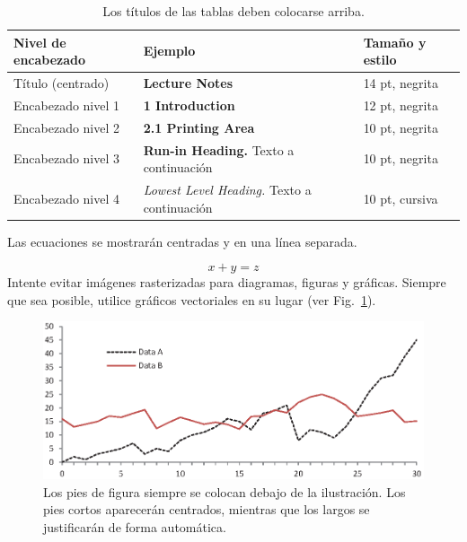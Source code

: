 \documentclass{sistedes}
\begin{document}
\begin{table}
\centering
\caption{Los títulos de las tablas deben colocarse arriba.}\label{tab1}
\begin{tabular}{|l|l|l|}
\hline
Nivel de encabezado & Ejemplo & Tamaño y estilo\\
\hline
Título (centrado) &  {\Large\bfseries Lecture Notes} & 14 pt, negrita\\
Encabezado nivel 1 &  {\large\bfseries 1 Introduction} & 12 pt, negrita\\
Encabezado nivel 2 & {\bfseries 2.1 Printing Area} & 10 pt, negrita\\
Encabezado nivel 3 & {\bfseries Run-in Heading.} Texto a continuación & 10 pt, negrita\\
Encabezado nivel 4 & {\itshape Lowest Level Heading.} Texto a continuación & 10 pt, cursiva\\
\hline
\end{tabular}
\end{table}


Las ecuaciones se mostrarán centradas y en una línea separada.

\begin{equation}
x + y = z
\end{equation}
Intente evitar imágenes rasterizadas para diagramas, figuras y gráficas. 
Siempre que sea posible, utilice gráficos vectoriales en su lugar
(ver Fig.~\ref{fig1}).

\begin{figure}
\includegraphics[width=\textwidth]{fig1.eps}
\caption{Los pies de figura siempre se colocan debajo de la ilustración.
Los pies cortos aparecerán centrados, mientras que los largos se justificarán 
de forma automática.} \label{fig1}
\end{figure}
\end{document}
